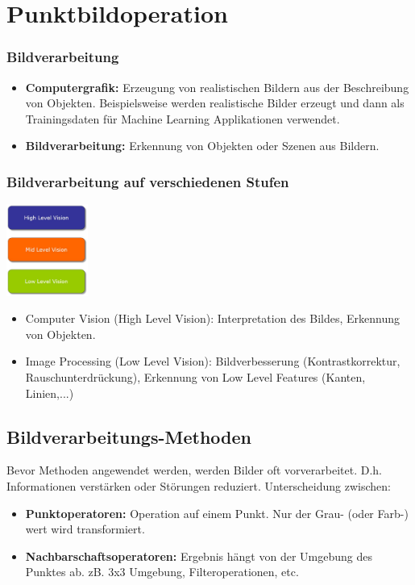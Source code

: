 \section{Punktbildoperation}


\subsubsection{Bildverarbeitung}
\begin{itemize}
	\itemsep0pt
	\item \textbf{Computergrafik:} Erzeugung von realistischen Bildern aus der Beschreibung von Objekten. Beispielsweise werden realistische Bilder erzeugt und dann als Trainingsdaten für Machine Learning Applikationen verwendet.
	\item \textbf{Bildverarbeitung:} Erkennung von Objekten oder Szenen aus Bildern.
\end{itemize}

\subsubsection{Bildverarbeitung auf verschiedenen Stufen}
\begin{center}
	\includegraphics[height=3cm,keepaspectratio]{images/sw01/StufenBildverarbeitung.JPG}
\end{center}

\begin{itemize}
	\itemsep0pt
	\item Computer Vision (High Level Vision): Interpretation des Bildes, Erkennung von Objekten. 
	\item Image Processing (Low Level Vision): Bildverbesserung (Kontrastkorrektur, Rauschunterdrückung), Erkennung von Low Level Features (Kanten, Linien,...)
\end{itemize}


\subsection{Bildverarbeitungs-Methoden}
Bevor Methoden angewendet werden, werden Bilder oft vorverarbeitet. D.h. Informationen verstärken oder Störungen reduziert.
\newline
\newline
Unterscheidung zwischen:
\begin{itemize}
	\itemsep0pt
	\item \textbf{Punktoperatoren:} Operation auf einem Punkt. Nur der Grau- (oder Farb-) wert wird transformiert.
	\item \textbf{Nachbarschaftsoperatoren:} Ergebnis hängt von der Umgebung des Punktes ab. zB. 3x3 Umgebung, Filteroperationen, etc.
\end{itemize}

